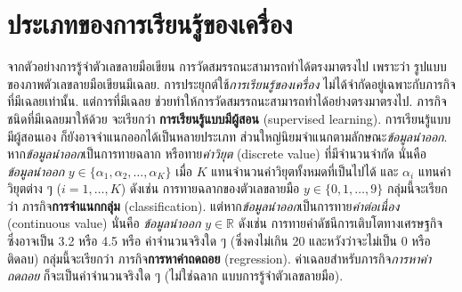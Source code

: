 \section{ประเภทของการเรียนรู้ของเครื่อง}
\label{sec: intro ML types} 

จากตัวอย่างการรู้จำตัวเลขลายมือเขียน
การวัดสมรรถนะสามารถทำได้ตรงมาตรงไป
เพราะว่า
รูปแบบของภาพตัวเลขลายมือเขียนมีเฉลย.
การประยุกต์ใช้\textit{การเรียนรู้ของเครื่อง} 
ไม่ได้จำกัดอยู่เฉพาะกับภารกิจที่มีเฉลยเท่านั้น.
แต่การที่มีเฉลย
ช่วยทำให้การวัดสมรรถนะสามารถทำได้อย่างตรงมาตรงไป.
ภารกิจชนิดที่มีเฉลยมาให้ด้วย จะเรียกว่า 
\textbf{การเรียนรู้แบบมีผู้สอน} (supervised learning).
การเรียนรู้แบบมีผู้สอนเอง ก็ยังอาจจำแนกออกได้เป็นหลายประเภท
ส่วนใหญ่นิยมจำแนกตามลักษณะ\textit{ข้อมูลนำออก}.
หาก\textit{ข้อมูลนำออก}เป็นการทายฉลาก 
หรือทาย\textit{ค่าวิยุต} (discrete value) ที่มีจำนวนจำกัด
นั่นคือ \textit{ข้อมูลนำออก} $y \in \{\alpha_1, \alpha_2, \ldots, \alpha_K \}$ เมื่อ $K$ แทนจำนวนค่าวิยุตทั้งหมดที่เป็นไปได้ และ $\alpha_i$ แทนค่าวิยุตต่าง ๆ ($i = 1, \ldots, K$)
ดังเช่น การทายฉลากของตัวเลขลายมือ $y \in \{0, 1, \ldots, 9\}$
กลุ่มนี้จะเรียกว่า ภารกิจ\textbf{การจำแนกกลุ่ม} (classification).
แต่หาก\textit{ข้อมูลนำออก}เป็นการทาย\textit{ค่าต่อเนื่อง} (continuous value)
นั่นคือ \textit{ข้อมูลนำออก} $y \in \mathbb{R}$
ดังเช่น การทายค่าดัชนีการเติบโตทางเศรษฐกิจ ซึ่งอาจเป็น 3.2 หรือ 4.5 หรือ ค่าจำนวนจริงใด ๆ (ซึ่งคงไม่เกิน 20 และหวังว่าจะไม่เป็น 0 หรือติดลบ)
กลุ่มนี้จะเรียกว่า ภารกิจ\textbf{การหาค่าถดถอย} (regression).
ค่าเฉลยสำหรับภารกิจ\textit{การหาค่าถดถอย} ก็จะเป็นค่าจำนวนจริงใด ๆ (ไม่ใช่ฉลาก แบบการรู้จำตัวเลขลายมือ).

